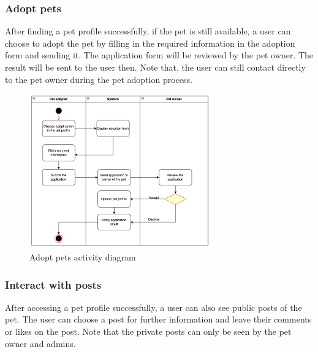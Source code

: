 \subsubsection{Adopt pets}

After finding a pet profile successfully, if the pet is still available, a user can choose to adopt the pet by filling in the required information in the adoption form and sending it. The application form will be reviewed by the pet owner. The result will be sent to the user then. Note that, the user can still contact directly to the pet owner during the pet adoption process.

\begin{figure}[H]
  \centering
  \includegraphics[width=0.7\textwidth]{Figures/adopt_pet.png}
  \caption{Adopt pets activity diagram}
  \label{fig:adopt-pet}
\end{figure}

\subsubsection{Interact with posts}

After accessing a pet profile successfully, a user can also see public posts of the pet. The user can choose a post for further information and leave their comments or likes on the post. Note that the private posts can only be seen by the pet owner and admins.

